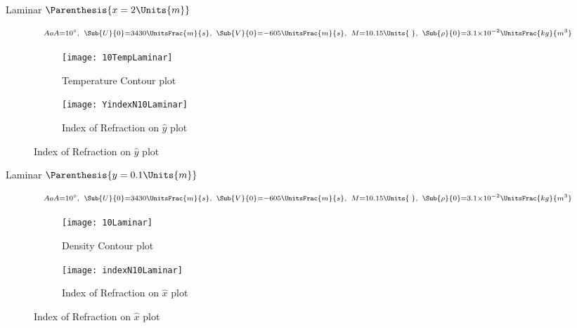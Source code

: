     \begin{frame}{Laminar $\Parenthesis{x = 2\Units{m}}$}
            \begin{figure}[t]
                \vspace{-1.5cm}
                \centering 
                $$\scriptstyle{ AoA = 10^{\circ},\;\; \Sub{U}{0}=3430\UnitsFrac{m}{s},\;\; \Sub{V}{0}=-605\UnitsFrac{m}{s},\;\;  M = 10.15\Units{\;},\;\; \Sub{\rho}{0} = 3.1\times 10^{-2}\UnitsFrac{kg}{m^3} }$$
            \begin{subfigure}{0.49\linewidth} \centering 
                \texttt{[image: 10TempLaminar]}
                \caption{Temperature Contour plot}
            \end{subfigure} 
            \begin{subfigure}{0.49\linewidth} \centering 
                \texttt{[image: YindexN10Laminar]}
                \caption{Index of Refraction on $\hat{y}$ plot}
            \end{subfigure}
        \end{figure}
    \end{frame}
    \begin{frame}{Laminar $\Parenthesis{y=0.1\Units{m}}$}
            \begin{figure}[t]
                \vspace{-1.5cm}
                \centering 
                $$\scriptstyle{ AoA = 10^{\circ},\;\; \Sub{U}{0}=3430\UnitsFrac{m}{s},\;\; \Sub{V}{0}=-605\UnitsFrac{m}{s},\;\;  M = 10.15\Units{\;},\;\; \Sub{\rho}{0} = 3.1\times 10^{-2}\UnitsFrac{kg}{m^3} }$$
            \begin{subfigure}{0.49\linewidth} \centering 
                \texttt{[image: 10Laminar]}
                \caption{Density Contour plot}
            \end{subfigure} 
            \begin{subfigure}{0.49\linewidth} \centering 
                \texttt{[image: indexN10Laminar]}
                \caption{Index of Refraction on $\hat{x}$ plot}
            \end{subfigure}
        \end{figure}
    \end{frame}


